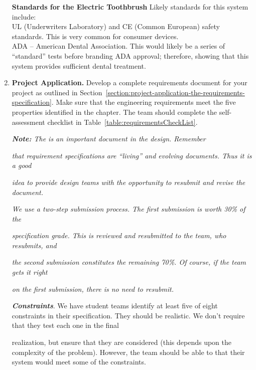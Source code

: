 \begin{enumerate}
\begin{onlysolution}
\textbf{Standards for the Electric Toothbrush}
Likely standards for this system include:\\
UL (Underwriters Laboratory) and CE (Common European) safety standards.
This is very common for consumer devices.\\
ADA -- American Dental Association. This would likely be a series of
``standard'' tests before branding ADA approval; therefore, showing that
this system provides sufficient dental treatment.

\end{onlysolution}    

    
  \item
    \textbf{Project Application.} Develop a complete requirements
    document for your project as outlined in 
    Section~\ref{section:project-application-the-requirements-specification}. Make sure that
    the engineering requirements meet the five properties identified in
    the chapter. The team should complete the self-assessment checklist
    in Table~\ref{table:requirementsCheckList}.
    
    
\begin{onlysolution}
    
    \emph{\textbf{Note:} The  is an
important document in the design. Remember}

\emph{that requirement specifications are ``living'' and evolving
documents. Thus it is a good}

\emph{idea to provide design teams with the opportunity to resubmit and
revise the document.}

\emph{We use a two-step submission process. The first submission is
worth 30\% of the}

\emph{specification grade. This is reviewed and resubmitted to the team,
who resubmits, and}

\emph{the second submission constitutes the remaining 70\%. Of course,
if the team gets it right}

\emph{on the first submission, there is no need to resubmit.}

\emph{\textbf{Constraints}}. We have student teams identify at least
five of eight constraints in their specification. They should be
realistic. We don't require that they test each one in the final

realization, but ensure that they are considered (this depends upon the
complexity of the problem). However, the team should be able to that
their system would meet some of the constraints.


\end{onlysolution}
\end{enumerate}

